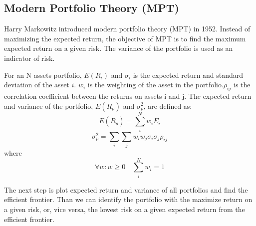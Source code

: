 \subsection{Modern Portfolio Theory (MPT)}
Harry Markowitz introduced modern portfolio theory (MPT) in 1952. Instead of maximizing the expected return, the objective of MPT is to find the maximum expected return on a given risk. The variance of the portfolio is used as an indicator of risk\cite{10.2307/2975974}. 
\par
For an N assets portfolio, \(E(R_i)\) and  \(\sigma_i\) is the expected return and standard deviation of the asset \(i\). \(w_i\) is the weighting of the asset in the portfolio.\(\rho_{ij}\) is the correlation coefficient between the returns on assets i and j.
The expected return and variance of the portfolio, \(E(R_p)\) and \(\sigma_p^2\), are defined as:
\[E(R_p) = \sum_i^N w_i E_i\]
\[\sigma_p^2 = \sum_i \sum_j w_i w_j \sigma_i \sigma_j \rho_{ij}\]
where
\[\forall w: w \geq 0 \quad \sum_i ^N w_i = 1\]
\par
The next step is plot expected return and variance of all portfolios and find the efficient frontier. Than we can identify the portfolio with the maximize return on a given risk, or, vice versa, the lowest risk on a given expected return from the efficient frontier.